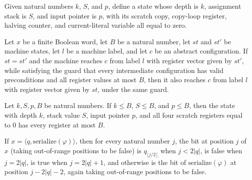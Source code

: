 \begin{definition}
\label{Complexity.LogProg.TQBFARM.stp}
\leanok
{}
Given natural numbers $k$, $S$, and $p$, define a state whose depth is $k$, assignment
stack is $S$, and input pointer is $p$, with its scratch copy, copy-loop register,
halving counter, and current-literal variable all equal to zero.
\end{definition}

\begin{lemma}
\label{Complexity.LogProg.TQBFARM.cont}
\leanok
{}
Let $x$ be a finite Boolean word, let $B$ be a natural number, let $st$ and $st'$ be
machine states, let $l$ be a machine label, and let $c$ be an abstract configuration. If
$st=st'$ and the machine reaches $c$ from label $l$ with register vector given by $st'$,
while satisfying the guard that every intermediate configuration has valid preconditions
and all register values at most $B$, then it also reaches $c$ from label $l$ with
register vector given by $st$, under the same guard.
\end{lemma}

\begin{lemma}
\label{Complexity.LogProg.TQBFARM.stp_bd}
\leanok
{}
Let $k,S,p,B$ be natural numbers. If $k\le B$, $S\le B$, and $p\le B$, then the state
with depth $k$, stack value $S$, input pointer $p$, and all four scratch registers equal
to $0$ has every register at most $B$.
\end{lemma}

\begin{lemma}
\label{Complexity.LogProg.TQBFARM.getD_enc}
\leanok
{}
If $x=\langle q,\mathrm{serialize}(\varphi)\rangle$, then for every natural number $j$,
the bit at position $j$ of $x$ (taking out-of-range positions to be false) is
$q_{\lfloor j/2\rfloor}$ when $j<2|q|$, is false when $j=2|q|$, is true when $j=2|q|+1$,
and otherwise is the bit of $\mathrm{serialize}(\varphi)$ at position $j-2|q|-2$, again
taking out-of-range positions to be false.
\end{lemma}

